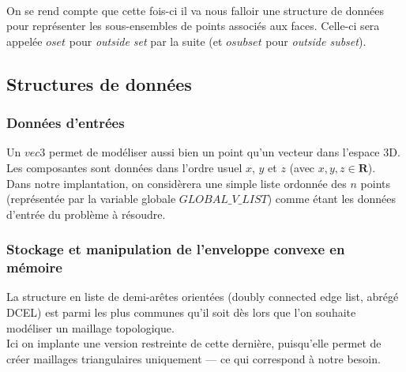 \documentclass[]{article}
\begin{document}
\paragraph{}
On se rend compte que cette fois-ci il va nous falloir une structure de données pour représenter les sous-ensembles de points associés aux faces. Celle-ci sera appelée $oset$ pour \emph{outside set} par la suite (et $osubset$ pour \emph{outside subset}).

\subsection{Structures de données}
\subsubsection{Données d'entrées}
Un $vec3$ permet de modéliser aussi bien un point qu'un vecteur dans l'espace 3D. Les composantes sont données dans l'ordre usuel $x$, $y$ et $z$ (avec $x, y, z \in \mathbf{R}$).\\
Dans notre implantation, on considèrera une simple liste ordonnée des $n$ points (représentée par la variable globale $GLOBAL\_V\_LIST$) comme étant les données d'entrée du problème à résoudre.

\subsubsection{Stockage et manipulation de l'enveloppe convexe en mémoire}
La structure en liste de demi-arêtes orientées (doubly connected edge list, abrégé DCEL) est parmi les plus communes qu'il soit dès lors que l'on souhaite modéliser un maillage topologique.\\
Ici on implante une version restreinte de cette dernière, puisqu'elle permet de créer maillages triangulaires uniquement — ce qui correspond à notre besoin.
\end{document}
